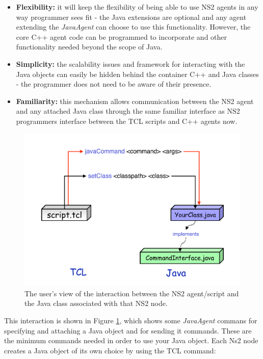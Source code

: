 \begin{itemize}
\item \textbf{Flexibility:} it will keep the flexibility of being able to use NS2 agents in any way programmer sees fit - the Java extensions are optional and any agent extending
the \emph{JavaAgent} can choose to use this functionality. However, the core
C++ agent code can be programmed to incorporate and other functionality 
needed beyond the scope of Java. 
\item  \textbf{Simplicity:} the scalability issues and framework for interacting with
the Java objects can easily be hidden behind the container C++ and Java classes 
- the programmer does not need to be aware of their presence.
\item  \textbf{Familiarity:} this mechanism allows communication between the 
NS2 agent and any attached Java class through the same familiar interface as NS2 programmers interface between the TCL scripts and C++ agents now.
\end{itemize}

\begin{figure}
\centering
\includegraphics[scale=0.4]{images/agentuserOverview}
\caption{The user's view of the interaction between the NS2 agent/script and
the Java class associated with that NS2 node.} 
\label{jni:fig:javaTCLJava}
\end{figure}

This interaction is shown in Figure \ref{jni:fig:javaTCLJava}, which shows 
some  \emph{JavaAgent} commans for specifying and attaching a Java
object and for sending it commands.  These are the minimum commands 
needed in order to use your Java object.  Each Ns2 node creates a 
Java object of its own choice by using the TCL command:

